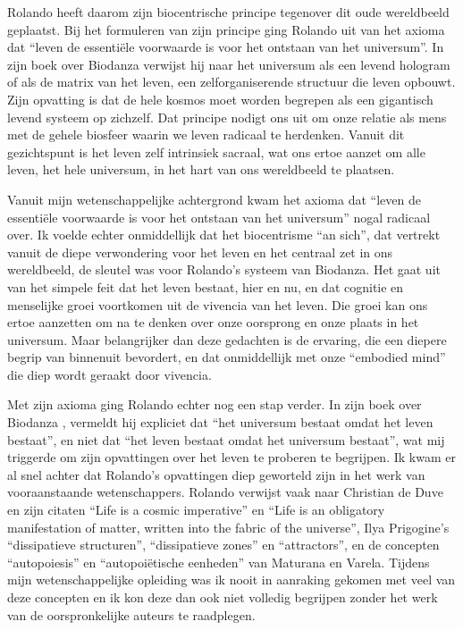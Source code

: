 \documentclass[
  11pt,
]{book}
\begin{document}
Rolando heeft daarom zijn biocentrische principe tegenover dit oude wereldbeeld geplaatst. Bij het formuleren van zijn principe ging Rolando uit van het axioma dat ``leven de essentiële voorwaarde is voor het ontstaan van het universum''. In zijn boek over Biodanza \citep{toro2008} verwijst hij naar het universum als een levend hologram of als de matrix van het leven, een zelforganiserende structuur die leven opbouwt. Zijn opvatting is dat de hele kosmos moet worden begrepen als een gigantisch levend systeem op zichzelf. Dat principe nodigt ons uit om onze relatie als mens met de gehele biosfeer waarin we leven radicaal te herdenken. Vanuit dit gezichtspunt is het leven zelf intrinsiek sacraal, wat ons ertoe aanzet om alle leven, het hele universum, in het hart van ons wereldbeeld te plaatsen.

Vanuit mijn wetenschappelijke achtergrond kwam het axioma dat ``leven de essentiële voorwaarde is voor het ontstaan van het universum'' nogal radicaal over. Ik voelde echter onmiddellijk dat het biocentrisme ``an sich'', dat vertrekt vanuit de diepe verwondering voor het leven en het centraal zet in ons wereldbeeld, de sleutel was voor Rolando's systeem van Biodanza. Het gaat uit van het simpele feit dat het leven bestaat, hier en nu, en dat cognitie en menselijke groei voortkomen uit de vivencia van het leven. Die groei kan ons ertoe aanzetten om na te denken over onze oorsprong en onze plaats in het universum. Maar belangrijker dan deze gedachten is de ervaring, die een diepere begrip van binnenuit bevordert, en dat onmiddellijk met onze ``embodied mind'' die diep wordt geraakt door vivencia.

Met zijn axioma ging Rolando echter nog een stap verder. In zijn boek over Biodanza \citep{toro2008}, vermeldt hij expliciet dat ``het universum bestaat omdat het leven bestaat'', en niet dat ``het leven bestaat omdat het universum bestaat'', wat mij triggerde om zijn opvattingen over het leven te proberen te begrijpen. Ik kwam er al snel achter dat Rolando's opvattingen diep geworteld zijn in het werk van vooraanstaande wetenschappers. Rolando verwijst vaak naar Christian de Duve en zijn citaten ``Life is a cosmic imperative'' en ``Life is an obligatory manifestation of matter, written into the fabric of the universe'', Ilya Prigogine's ``dissipatieve structuren'', ``dissipatieve zones'' en ``attractors'', en de concepten ``autopoiesis'' en ``autopoiëtische eenheden'' van Maturana en Varela. Tijdens mijn wetenschappelijke opleiding was ik nooit in aanraking gekomen met veel van deze concepten en ik kon deze dan ook niet volledig begrijpen zonder het werk van de oorspronkelijke auteurs te raadplegen.
\end{document}
